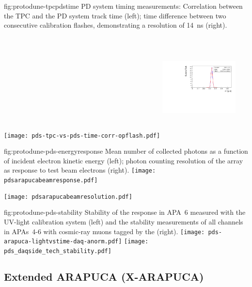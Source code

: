\begin{dunefigure}{fig:protodune-tpcpdstime}
{PD system timing measurements: Correlation between the TPC and the PD system track time (left); time difference between two consecutive calibration flashes, demonstrating a resolution of \SI{14}{ns} (right).}

\texttt{[image: pds-tpc-vs-pds-time-corr-opflash.pdf]}
\includegraphics[height=5.5cm,width=0.3\textwidth]{graphics/pds-example-dT.pdf}
\end{dunefigure}

\begin{dunefigure}{fig:protodune-pds-energyresponse}
{Mean number of collected photons as a function of incident electron kinetic energy (left);  photon counting resolution of the  array as response to test beam electrons (right).}
\texttt{[image: pdsarapucabeamresponse.pdf]}

\texttt{[image: pdsarapucabeamresolution.pdf]}

\end{dunefigure}

\begin{dunefigure}{fig:protodune-pds-stability}
{Stability of the  response in APA~6 measured with the UV-light calibration system (left) and the stability measurements of all  channels in APAs~4-6 with cosmic-ray muons tagged by the  (right).}
\texttt{[image: pds-arapuca-lightvstime-daq-anorm.pdf]}
\texttt{[image: pds\_daqside\_tech\_stability.pdf]}
\end{dunefigure}

 

\subsection{Extended ARAPUCA (X-ARAPUCA)}
\label{sec:xarapuca-valid}


